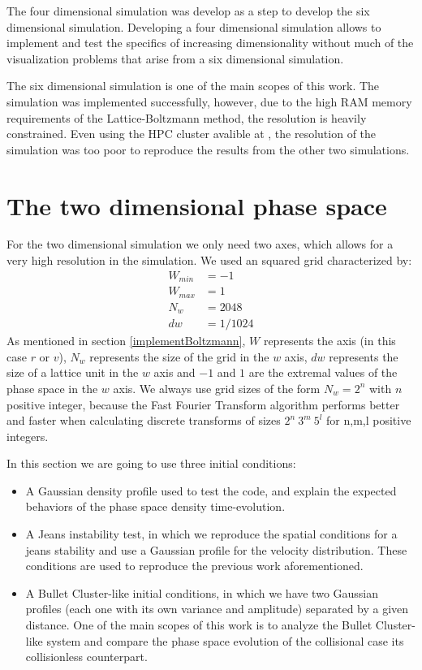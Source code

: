 The four dimensional simulation was develop as a step to develop the six dimensional simulation. Developing a four dimensional simulation allows to implement and test the specifics of increasing dimensionality without much of the visualization problems that arise from a six dimensional simulation. 

The six dimensional simulation is one of the main scopes of this work. The simulation was implemented successfully, however, due to the high RAM memory requirements of the Lattice-Boltzmann method, the resolution is heavily constrained. Even using the HPC cluster avalible at , the resolution of the simulation was too poor to reproduce the results from the other two simulations.

\section{The two dimensional phase space}

For the two dimensional simulation we only need two axes, which allows for a very high resolution in the simulation. We used an squared grid characterized by:
\begin{align}
W_{min} &= -1\\
W_{max} &= 1\\
N_w &= 2048\\
dw &= 1/1024
\end{align}
As mentioned in section \ref{implementBoltzmann}, $W$ represents the axis (in this case $r$ or $v$), $N_w$ represents the size of the grid in the $w$ axis, $dw$ represents the size of a lattice unit in the $w$ axis and $-1$ and $1$ are the extremal values of the phase space in the $w$ axis.
We always use grid sizes of the form $N_w = 2^n$ with $n$ positive integer, because the Fast Fourier Transform algorithm performs better and faster when calculating discrete transforms of sizes $2^n \ 3^m \ 5^l$ for n,m,l positive integers.%

In this section we are going to use three initial conditions:
\begin{itemize}
\item A Gaussian density profile used to test the code, and explain the expected behaviors of the phase space density time-evolution.
\item A Jeans instability test, in which we reproduce the spatial conditions for a jeans stability and use a Gaussian profile for the velocity distribution. These conditions are used to reproduce the previous work aforementioned.
\item A Bullet Cluster-like initial conditions, in which we have two Gaussian profiles (each one with its own variance and amplitude) separated by a given distance. One of the main scopes of this work is to analyze the Bullet Cluster-like system and compare the phase space evolution of the collisional case its collisionless counterpart.
\end{itemize}
